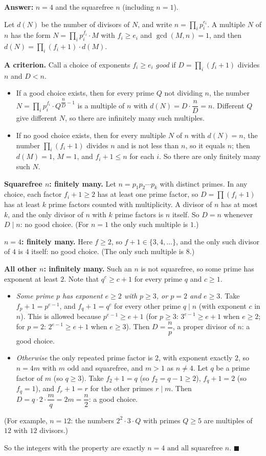 \textbf{Answer:} $n=4$ and the squarefree $n$ (including $n=1$).

Let $d(N)$ be the number of divisors of $N$, and write $n=\prod_i p_i^{e_i}$. A multiple $N$ of $n$ has the form $N=\prod_i p_i^{f_i}\cdot M$ with $f_i\ge e_i$ and $\gcd(M,n)=1$, and then $d(N)=\prod_i(f_i+1)\cdot d(M)$.

\textbf{A criterion.} Call a choice of exponents $f_i\ge e_i$ \emph{good} if $D=\prod_i(f_i+1)$ divides $n$ and $D<n$.
\begin{itemize}
\item If a good choice exists, then for every prime $Q$ not dividing $n$, the number $N=\prod_i p_i^{f_i}\cdot Q^{\dfrac nD-1}$ is a multiple of $n$ with $d(N)=D\cdot\dfrac nD=n$. Different $Q$ give different $N$, so there are infinitely many such multiples.
\item If no good choice exists, then for every multiple $N$ of $n$ with $d(N)=n$, the number $\prod_i(f_i+1)$ divides $n$ and is not less than $n$, so it equals $n$; then $d(M)=1$, $M=1$, and $f_i+1\le n$ for each $i$. So there are only finitely many such $N$.
\end{itemize}

\textbf{Squarefree $n$: finitely many.} Let $n=p_1p_2\cdots p_k$ with distinct primes. In any choice, each factor $f_i+1\ge2$ has at least one prime factor, so $D=\prod(f_i+1)$ has at least $k$ prime factors counted with multiplicity. A divisor of $n$ has at most $k$, and the only divisor of $n$ with $k$ prime factors is $n$ itself. So $D=n$ whenever $D\mid n$: no good choice. (For $n=1$ the only such multiple is $1$.)

\textbf{$n=4$: finitely many.} Here $f\ge2$, so $f+1\in\{3,4,\dots\}$, and the only such divisor of $4$ is $4$ itself: no good choice. (The only such multiple is $8$.)

\textbf{All other $n$: infinitely many.} Such an $n$ is not squarefree, so some prime has exponent at least $2$. Note that $q^c\ge c+1$ for every prime $q$ and $c\ge1$.
\begin{itemize}
\item \emph{Some prime $p$ has exponent $e\ge2$ with $p\ge3$, or $p=2$ and $e\ge3$.} Take $f_p+1=p^{e-1}$, and $f_q+1=q^c$ for every other prime $q\mid n$ (with exponent $c$ in $n$). This is allowed because $p^{e-1}\ge e+1$ (for $p\ge3$: $3^{e-1}\ge e+1$ when $e\ge2$; for $p=2$: $2^{e-1}\ge e+1$ when $e\ge3$). Then $D=\dfrac np$, a proper divisor of $n$: a good choice.
\item \emph{Otherwise} the only repeated prime factor is $2$, with exponent exactly $2$, so $n=4m$ with $m$ odd and squarefree, and $m>1$ as $n\ne4$. Let $q$ be a prime factor of $m$ (so $q\ge3$). Take $f_2+1=q$ (so $f_2=q-1\ge2$), $f_q+1=2$ (so $f_q=1$), and $f_r+1=r$ for the other primes $r\mid m$. Then $D=q\cdot2\cdot\dfrac mq=2m=\dfrac n2$: a good choice.
\end{itemize}
(For example, $n=12$: the numbers $2^2\cdot3\cdot Q$ with primes $Q\ge5$ are multiples of $12$ with $12$ divisors.)

So the integers with the property are exactly $\boxed{n=4\text{ and all squarefree }n}$. $\blacksquare$
